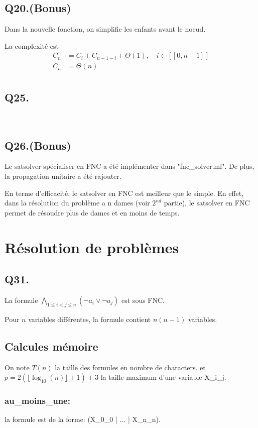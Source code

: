     \subsection*{Q20.(Bonus)}
    Dans la nouvelle fonction, on simplifie les enfants avant le noeud.
    
    La complexité est
    \begin{align*}
        C_n &= C_{i} + C_{n-1-i} + \Theta(1), \quad i \in [\![0,n-1]\!]\\
        C_n &= \boxed{\Theta(n)}\\
    \end{align*}
    
    \subsection*{Q25.}~
    
    \subsection*{Q26.(Bonus)}
    Le satsolver spécialiser en FNC a été implémenter dans "fnc\_solver.ml".
    De plus, la propagation unitaire a été rajouter.
    
    En terme d'efficacité, le satsolver en FNC est meilleur que le simple.
    En effet, dans la résolution du problème a n dames (voir $2^{nd}$ partie),
    le satsolver en FNC permet de résoudre plus de dames et en moins de temps.
    
    \section{Résolution de problèmes}
    \subsection*{Q31.}
    La formule
    $\boxed{\bigwedge\limits_{1 \leq i < j \leq n}\left(\lnot a_i \lor \lnot a_j\right)}$
    est sous FNC.
    
    Pour $n$ variables différentes, la formule contient $n(n-1)$ variables.

    \subsection*{Calcules mémoire}
    On note $T(n)$ la taille des formules en nombre de characters.
    et $p = 2(\lfloor \log_{10}(n)\rfloor + 1) + 3$ la taille maximum d'une variable X\_i\_j.
    \subsubsection*{au\_moins\_une:}
    la formule est de la forme: (X\_0\_0 | ... | X\_n\_n).

